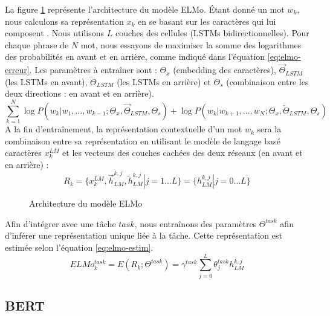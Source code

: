 \documentclass{KodeBook}
\begin{document}
La figure \ref{fig:elmo-arch} représente l'architecture du modèle ELMo. 
Étant donné un mot $w_k$, nous calculons sa représentation $x_k$ en se basant sur les caractères qui lui composent \cite{2015-kim-al}. 
Nous utilisons $L$ couches des cellules  (LSTMs bidirectionnelles). 
Pour chaque  phrase de $N$ mot, nous essayons de maximiser la somme des logarithmes des probabilités en avant et en arrière, comme indiqué dans l'équation \ref{eq:elmo-erreur}. 
Les paramètres à entraîner sont : $\Theta_x$ (embedding des caractères), $\overrightarrow{\Theta}_{LSTM}$ (les LSTMs en avant), $\overleftarrow{\Theta}_{LSTM}$ (les LSTMs en arrière) et $\Theta_s$ (combinaison entre les deux directions : en avant et en arrière).
\begin{equation}
\sum_{k=1}^{N} 
\log P(w_k | w_1,\ldots,w_{k-1}; \Theta_x, \overrightarrow{\Theta}_{LSTM}, \Theta_s)
+
\log P(w_k | w_{k+1},\ldots,w_{N}; \Theta_x, \overleftarrow{\Theta}_{LSTM}, \Theta_s)
\label{eq:elmo-erreur}
\end{equation}
A la fin d'entraînement, la représentation contextuelle d'un mot $w_k$ sera la combinaison entre sa représentation en utilisant le modèle de langage basé caractères $x_k^{LM}$ et les vecteurs des couches cachées des deux réseaux  (en avant et en arrière) : 
\[
R_k = \{x_k^{LM}, \overrightarrow{h}_{LM}^{k, j}, \overleftarrow{h}_{LM}^{k, j} | j= 1 \ldots L \}
= \{h_{LM}^{k, j} | j= 0 \ldots L \}
\]

\begin{figure}[ht]
	\centering
	\caption{Architecture du modèle ELMo}
	\label{fig:elmo-arch}
\end{figure}

Afin d'intégrer  avec une tâche  $task$, nous entraînons des paramètres $\Theta^{task}$ afin d'inférer une représentation unique liée à la tâche.
Cette représentation est estimée selon l'équation \ref{eq:elmo-estim}. 
\begin{equation}
ELMo_k^{task} = E(R_k; \Theta^{task}) = \gamma^{task} \sum_{j=0}^{L} \theta_j^{task} h_{LM}^{k, j}
\label{eq:elmo-estim}
\end{equation}

\vfill
\subsection{BERT}
\end{document}
